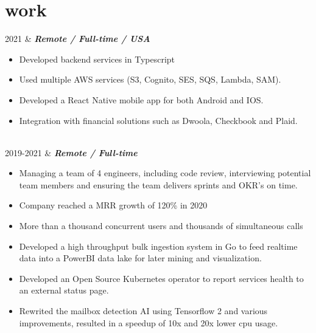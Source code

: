 \documentclass[]{cv-mauri}
\begin{document}
\section*{work}
\begin{tabularcv}
	2021   &   
					\textbf{\textit{Remote / Full-time / USA}}

			\begin{itemize}
				\item Developed backend services in Typescript
				\item Used multiple AWS services (S3, Cognito, SES, SQS, Lambda, SAM).
				\item Developed a React Native mobile app for both Android and IOS.
				\item Integration with financial solutions such as Dwoola, Checkbook and Plaid.
			\end{itemize}
					\\[\vspacepar]
	
    2019-2021   &   
                    \textbf{\textit{Remote / Full-time}}
            \begin{itemize}
            	\item Managing a team of 4 engineers, including code review, interviewing potential team members and ensuring the team delivers sprints and OKR's on time.
            	\item Company reached a MRR growth of 120\% in 2020
            	\item More than a thousand concurrent users and thousands of simultaneous calls
            	\item Developed a high throughput bulk ingestion system in Go to feed realtime data into a PowerBI data lake for later mining and visualization.
            	\item Developed an Open Source Kubernetes operator to report services health to an external status page.
            	\item Rewrited the mailbox detection AI using Tensorflow 2 and various improvements, resulted in a speedup of 10x and 20x lower cpu usage.
            \end{itemize}
                    \\[\vspacepar]


\end{tabularcv}
\end{document}
